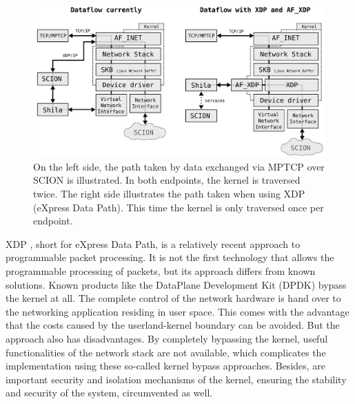 \begin{figure}[H]
	\begin{center}
		\def\svgwidth{1\textwidth}
		\includegraphics[scale=0.2]{../illustrations/futureWork/DetourAndWithXDP.pdf}   
		\caption[Caption for the list of figures.]{On the left side, the path taken by data exchanged via MPTCP over SCION is illustrated. In both endpoints, the kernel is traversed twice. The right side illustrates the path taken when using XDP (eXpress Data Path). This time the kernel is only traversed once per endpoint.}
		\label{fig:ShilaDetourKernel}
	\end{center}
\end{figure}

XDP \cite{XDP,XDPGitHub}, short for eXpress Data Path, is a relatively recent approach to programmable packet processing. It is not the first technology that allows the programmable processing of packets, but its approach differs from known solutions.  Known products like the  DataPlane Development Kit (DPDK) \cite{DPDK} bypass the kernel at all. The complete control of the network hardware is hand over to the networking application residing in user space. This comes with the advantage that the costs caused by the userland-kernel boundary can be avoided. But the approach also has disadvantages. By completely bypassing the kernel, useful functionalities of the network stack are not available, which complicates the implementation using these so-called kernel bypass approaches. Besides, are important security and isolation mechanisms of the kernel, ensuring the stability and security of the system, circumvented as well. 

